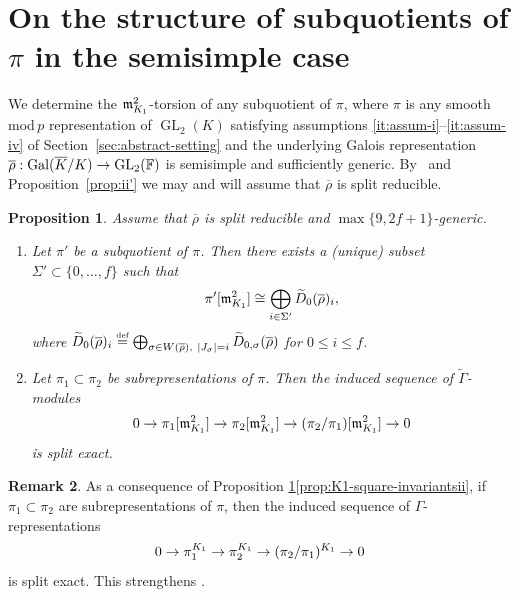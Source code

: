 \documentclass[JEP,XML,SOM,Unicode,NoFloatCountersInSection, NoEqCountersInSection,published]{cedram}
\let\wt\widetilde
\let\ovl\overline
\newcommand{\defeq}{\stackrel{\textrm{\tiny{\upshape{def}}}}{=}}
\newcommand{\F}{\mathbb{F}}
\newcommand{\rhobar}{\overline{\rho}}
\newcommand{\brho}{\overline{\rho}}
\DeclareMathOperator{\Gal}{Gal}
\DeclareMathOperator{\GL}{GL}
\theoremstyle{plain}
\newtheorem{prop1}{Proposition}[section]
\theoremstyle{definition}
\newtheorem{rem1}[prop1]{Remark}
\begin{document}
\section{On the structure of subquotients of \texorpdfstring{$\pi$}{pi} in the semisimple case}
\label{sec:subquot-ss}

We determine the $\mathfrak{m}_{K_1}^2$-torsion of any subquotient of $\pi$, where $\pi$ is any smooth mod\,$p$ representation of $\GL_2(K)$ satisfying assumptions \eqref{it:assum-i}--\eqref{it:assum-iv} of Section~\ref{sec:abstract-setting} and the underlying Galois representation $\rhobar:\Gal(\ovl K/K)\ra\GL_2(\F)$ is semisimple and {sufficiently} generic. By~\cite[Cor.\,3.90]{BHHMS2} and Proposition~\ref{prop:ii'} we may and will assume that $\brho$ is split reducible.

\begin{prop1}\label{prop:K1-square-invariants}
Assume that $\brho$ is split reducible and $\max\{9,2f+1\}$-generic.
\begin{enumerate}
\item\label{prop:K1-square-invariantsi}
Let $\pi'$ be a subquotient of $\pi$. Then there exists a (unique) subset $\Sigma'\subset\{0,\dots,f\}$ such that
\[
\pi'[\m_{K_1}^2]\cong\bigoplus_{i\in\Sigma'}\wt{D}_0(\brho)_i,
\]
where $\wt{D}_{0}(\brho)_i\defeq \bigoplus_{\sigma\in W(\brho),~|J_{\sigma}|=i}\wt{D}_{0,\sigma}(\brho)$ for $0\leq i\leq f$.

\item\label{prop:K1-square-invariantsii} Let $\pi_1\subset\pi_2$ be subrepresentations of $\pi$. Then the induced sequence of $\wt{\Gamma}$-modules
\[
0\to \pi_1[\mathfrak{m}_{K_1}^2]\to \pi_2[\mathfrak{m}_{K_1}^2]\to (\pi_2/\pi_1)[\mathfrak{m}_{K_1}^2]\rightarrow0
\]
is split exact.
\end{enumerate}
\end{prop1}

\begin{rem1}\label{rem:K1-invt-exact}
As a consequence of Proposition \ref{prop:K1-square-invariants}\eqref{prop:K1-square-invariantsii}, if~$\pi_1\subset\pi_2$ are subrepresentations of $\pi$, then the induced sequence of $\Gamma$-representations
\[
0\to \pi_1^{K_1}\to \pi_2^{K_1}\rightarrow(\pi_2/\pi_1)^{K_1}\rightarrow0
\]
is split exact. This strengthens \cite[Lem.\,3.2.6]{BHHMS4}.
\end{rem1}
\end{document}
